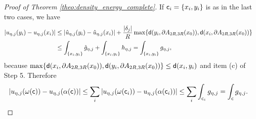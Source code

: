 \documentclass[12pt]{amsart}
\newcommand{\sfd}{{\sf d}}
\theoremstyle{definition}
\newcommand{\sfc}{{\sf c}}
\begin{document}
\begin{proof}[Proof of Theorem \ref{theo:density_energy_complete}]
        If $\sfc_i = \{x_i,y_i\}$ is as in the last two cases, we have
        \begin{equation}
            \begin{aligned}
                \vert u_{\eta,j}(y_i) - u_{\eta,j}(x_i) \vert &\le \vert \hat{u}_{\eta,j}(y_i) - \hat{u}_{\eta,j}(x_i)\vert + \frac{\vert \delta_j \vert}{R}\max\{\sfd(y_i,\partial A_{2R,3R}(x_0)), \sfd(x_i,\partial A_{2R,3R}(x_0))\}\\
                &\le \int_{\{x_i,y_i\}} \hat{g}_{\eta,j} + \int_{\{x_i,y_i\}} h_{\eta,j} = \int_{\{x_i,y_i\}} g_{\eta,j},
            \end{aligned}
        \end{equation}
        because $\max\{\sfd(x_i,\partial A_{2R,3R}(x_0)), \sfd(y_i,\partial A_{2R,3R}(x_0))\} \le \sfd(x_i,y_i)$ and item (c) of Step 5. Therefore
        $$\vert u_{\eta,j}(\omega(\sfc)) - u_{\eta,j}(\alpha(\sfc)) \vert \le \sum_i \vert u_{\eta,j}(\omega(\sfc_i)) - u_{\eta,j}(\alpha(\sfc_i)) \vert \le \sum_i\int_{\sfc_i} g_{\eta,j} = \int_{\sfc} g_{\eta,j}.$$
        \vspace{2mm}


\end{proof}
\end{document}
